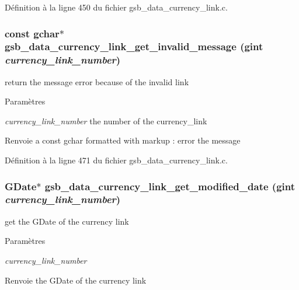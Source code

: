 Définition à la ligne 450 du fichier gsb\_\-data\_\-currency\_\-link.c.

\subsubsection[{gsb\_\-data\_\-currency\_\-link\_\-get\_\-invalid\_\-message}]{\setlength{\rightskip}{0pt plus 5cm}const gchar$\ast$ gsb\_\-data\_\-currency\_\-link\_\-get\_\-invalid\_\-message (gint {\em currency\_\-link\_\-number})}\label{gsb__data__currency__link_8c_a2e557736f1bcf1f082a81f73a36542c1}
return the message error because of the invalid link


\begin{DoxyParams}{Paramètres}
\item[{\em currency\_\-link\_\-number}]the number of the currency\_\-link\end{DoxyParams}
\begin{DoxyReturn}{Renvoie}
a const gchar formatted with markup : error the message 
\end{DoxyReturn}


Définition à la ligne 471 du fichier gsb\_\-data\_\-currency\_\-link.c.

\subsubsection[{gsb\_\-data\_\-currency\_\-link\_\-get\_\-modified\_\-date}]{\setlength{\rightskip}{0pt plus 5cm}GDate$\ast$ gsb\_\-data\_\-currency\_\-link\_\-get\_\-modified\_\-date (gint {\em currency\_\-link\_\-number})}\label{gsb__data__currency__link_8c_aa69aa5e3a5a36188b6b78e37f72a566c}
get the GDate of the currency link


\begin{DoxyParams}{Paramètres}
\item[{\em currency\_\-link\_\-number}]\end{DoxyParams}
\begin{DoxyReturn}{Renvoie}
the GDate of the currency link 
\end{DoxyReturn}


